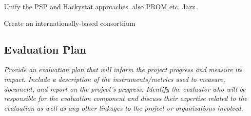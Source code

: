 Unify the PSP and Hackystat approaches. also PROM etc. Jazz. 

Create an internationally-based consortiium

\subsection{Evaluation Plan}

{\em Provide an evaluation plan that will inform the project progress and measure its impact.  Include a description of the instruments/metrics used to measure, document, and report on the project's progress.  Identify the evaluator who will be responsible for the evaluation component and discuss their expertise related to the evaluation as well as any other linkages to the project or organizations involved.  }






